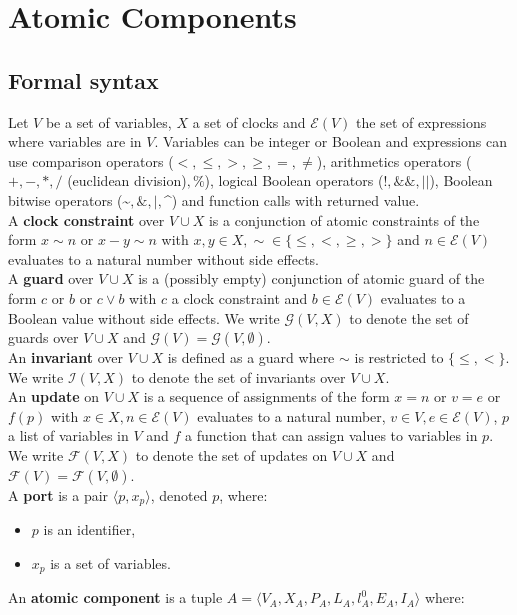 \documentclass[a4paper]{article}
\begin{document}
\section*{Atomic Components}
\subsection*{Formal syntax}
Let $V$ be a set of variables, $X$ a set of clocks and $\mathcal{E}(V)$ the set of expressions where variables are in
$V$. Variables can be integer or Boolean and expressions can use comparison operators ($<,\leq,>,\geq,=,\neq$),
arithmetics operators ($+,-,*,/$ (euclidean division)$,\%$), logical Boolean operators ($!, \&\&, ||$), Boolean bitwise
operators (\textasciitilde$, \&, |,$\textasciicircum) and function calls with returned value.\\
A \textbf{clock constraint} over $V \cup X$ is a conjunction of atomic constraints of the form
$x \sim n$ or $x - y \sim n$ with $x,y \in X, \sim \in \{\leq, <, \geq, >\}$ and $n \in \mathcal{E}(V)$ evaluates to a
natural number without side effects. \\
A \textbf{guard} over $V \cup X$ is a (possibly empty) conjunction of atomic guard of the form $c$ or $b$ or $c \vee b$
with $c$ a clock constraint and $b \in \mathcal{E}(V)$ evaluates to a Boolean value without side effects. We write
$\mathcal{G}(V, X)$ to denote the set of guards over $V \cup X$ and $\mathcal{G}(V) = \mathcal{G}(V, \emptyset)$. \\
An \textbf{invariant} over $V \cup X$ is defined as a guard where $\sim$ is restricted to $\{\leq, <\}$. We write
$\mathcal{I}(V, X)$ to denote the set of invariants over $V \cup X$. \\
An \textbf{update} on $V \cup X$ is a sequence of assignments of the form $x = n$ or $v = e$ or $f(p)$ with
$x \in X, n \in \mathcal{E}(V)$ evaluates to a natural number, $v \in V, e \in \mathcal{E}(V)$, $p$ a list of variables
in $V$ and $f$ a function that can assign values to variables in $p$. We write $\mathcal{F}(V,X)$ to denote the set of
updates on $V \cup X$ and $\mathcal{F}(V) = \mathcal{F}(V,\emptyset)$.\\
A \textbf{port} is a pair $\langle p, x_p \rangle$, denoted $p$, where:
\begin{itemize}
  \item $p$ is an identifier,
  \item $x_p$ is a set of variables.
\end{itemize}
An \textbf{atomic component} is a tuple $A = \langle V_A, X_A, P_A, L_A, l_A^0, E_A, I_A \rangle$ where:
\end{document}
